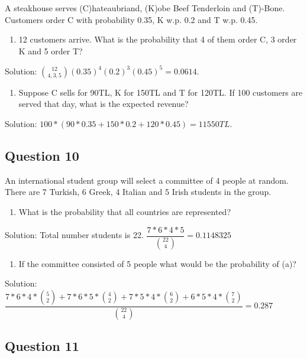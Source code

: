 \documentclass[]{book}
\providecommand{\tightlist}{%
  \setlength{\itemsep}{0pt}\setlength{\parskip}{0pt}}
\theoremstyle{definition}
\theoremstyle{definition}
\theoremstyle{definition}
\theoremstyle{remark}
\begin{document}
A steakhouse serves (C)hateaubriand, (K)obe Beef Tenderloin and
(T)-Bone. Customers order C with probability 0.35, K w.p. 0.2 and T w.p.
0.45.

\begin{enumerate}
\def\labelenumi{\alph{enumi})}
\tightlist
\item
  12 customers arrive. What is the probability that 4 of them order C, 3
  order K and 5 order T?
\end{enumerate}

Solution: \(\binom{12}{4,3,5}(0.35)^4(0.2)^3(0.45)^5 = 0.0614\).

\begin{enumerate}
\def\labelenumi{\alph{enumi})}
\setcounter{enumi}{1}
\tightlist
\item
  Suppose C sells for 90TL, K for 150TL and T for 120TL. If 100
  customers are served that day, what is the expected revenue?
\end{enumerate}

Solution: \(100*(90*0.35 + 150*0.2 + 120*0.45) = 11550TL\).

\hypertarget{question-10}{%
\subsection{Question 10}\label{question-10}}

An international student group will select a committee of 4 people at
random. There are 7 Turkish, 6 Greek, 4 Italian and 5 Irish students in
the group.

\begin{enumerate}
\def\labelenumi{\alph{enumi})}
\tightlist
\item
  What is the probability that all countries are represented?
\end{enumerate}

Solution: Total number students is 22.
\(\dfrac{7*6*4*5}{\binom{22}{4}} = 0.1148325\)

\begin{enumerate}
\def\labelenumi{\alph{enumi})}
\setcounter{enumi}{1}
\tightlist
\item
  If the committee consisted of 5 people what would be the probability
  of (a)?
\end{enumerate}

Solution:
\(\dfrac{7*6*4*\binom{5}{2} + 7*6*5*\binom{4}{2} + 7*5*4*\binom{6}{2} + 6*5*4*\binom{7}{2}}{\binom{22}{4}} = 0.287\)

\hypertarget{question-11}{%
\subsection{Question 11}\label{question-11}}
\end{document}
